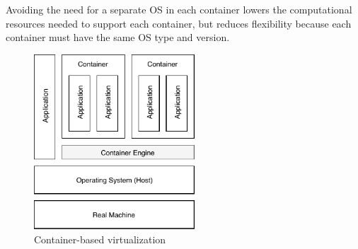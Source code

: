 	
	
	Avoiding the need for a separate OS in each container lowers the computational resources needed to support each container, but reduces flexibility because each container must have the same OS type and version. 

	\begin{figure}[H]
		\centering
		\includegraphics[width=6cm]{images/container-BasedVirtualization.pdf}
		\vspace{-0.2cm}
		\caption{Container-based virtualization}
		\label{fig:container-baseVirtualization}
	\end{figure}
	